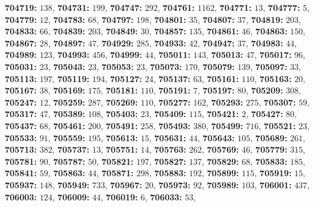 \textsf{\bfseries 704719:} $138$, \textsf{\bfseries 704731:} $199$, \textsf{\bfseries 704747:} $292$, \textsf{\bfseries 704761:} $1162$, \textsf{\bfseries 704771:} $13$, \textsf{\bfseries 704777:} $5$, \textsf{\bfseries 704779:} $12$, \textsf{\bfseries 704783:} $68$, \textsf{\bfseries 704797:} $198$, \textsf{\bfseries 704801:} $35$, \textsf{\bfseries 704807:} $37$, \textsf{\bfseries 704819:} $203$, \textsf{\bfseries 704833:} $66$, \textsf{\bfseries 704839:} $203$, \textsf{\bfseries 704849:} $30$, \textsf{\bfseries 704857:} $135$, \textsf{\bfseries 704861:} $46$, \textsf{\bfseries 704863:} $150$, \textsf{\bfseries 704867:} $28$, \textsf{\bfseries 704897:} $47$, \textsf{\bfseries 704929:} $285$, \textsf{\bfseries 704933:} $42$, \textsf{\bfseries 704947:} $37$, \textsf{\bfseries 704983:} $44$, \textsf{\bfseries 704989:} $123$, \textsf{\bfseries 704993:} $456$, \textsf{\bfseries 704999:} $44$, \textsf{\bfseries 705011:} $143$, \textsf{\bfseries 705013:} $47$, \textsf{\bfseries 705017:} $96$, \textsf{\bfseries 705031:} $23$, \textsf{\bfseries 705043:} $23$, \textsf{\bfseries 705053:} $23$, \textsf{\bfseries 705073:} $170$, \textsf{\bfseries 705079:} $139$, \textsf{\bfseries 705097:} $33$, \textsf{\bfseries 705113:} $197$, \textsf{\bfseries 705119:} $194$, \textsf{\bfseries 705127:} $24$, \textsf{\bfseries 705137:} $63$, \textsf{\bfseries 705161:} $110$, \textsf{\bfseries 705163:} $20$, \textsf{\bfseries 705167:} $38$, \textsf{\bfseries 705169:} $175$, \textsf{\bfseries 705181:} $110$, \textsf{\bfseries 705191:} $7$, \textsf{\bfseries 705197:} $80$, \textsf{\bfseries 705209:} $308$, \textsf{\bfseries 705247:} $12$, \textsf{\bfseries 705259:} $287$, \textsf{\bfseries 705269:} $110$, \textsf{\bfseries 705277:} $162$, \textsf{\bfseries 705293:} $275$, \textsf{\bfseries 705307:} $59$, \textsf{\bfseries 705317:} $47$, \textsf{\bfseries 705389:} $108$, \textsf{\bfseries 705403:} $23$, \textsf{\bfseries 705409:} $115$, \textsf{\bfseries 705421:} $2$, \textsf{\bfseries 705427:} $80$, \textsf{\bfseries 705437:} $68$, \textsf{\bfseries 705461:} $200$, \textsf{\bfseries 705491:} $258$, \textsf{\bfseries 705493:} $380$, \textsf{\bfseries 705499:} $716$, \textsf{\bfseries 705521:} $23$, \textsf{\bfseries 705533:} $91$, \textsf{\bfseries 705559:} $195$, \textsf{\bfseries 705613:} $15$, \textsf{\bfseries 705631:} $44$, \textsf{\bfseries 705643:} $105$, \textsf{\bfseries 705689:} $261$, \textsf{\bfseries 705713:} $382$, \textsf{\bfseries 705737:} $13$, \textsf{\bfseries 705751:} $14$, \textsf{\bfseries 705763:} $262$, \textsf{\bfseries 705769:} $46$, \textsf{\bfseries 705779:} $315$, \textsf{\bfseries 705781:} $90$, \textsf{\bfseries 705787:} $50$, \textsf{\bfseries 705821:} $197$, \textsf{\bfseries 705827:} $137$, \textsf{\bfseries 705829:} $68$, \textsf{\bfseries 705833:} $185$, \textsf{\bfseries 705841:} $59$, \textsf{\bfseries 705863:} $44$, \textsf{\bfseries 705871:} $298$, \textsf{\bfseries 705883:} $192$, \textsf{\bfseries 705899:} $115$, \textsf{\bfseries 705919:} $15$, \textsf{\bfseries 705937:} $148$, \textsf{\bfseries 705949:} $733$, \textsf{\bfseries 705967:} $20$, \textsf{\bfseries 705973:} $92$, \textsf{\bfseries 705989:} $103$, \textsf{\bfseries 706001:} $437$, \textsf{\bfseries 706003:} $124$, \textsf{\bfseries 706009:} $44$, \textsf{\bfseries 706019:} $6$, \textsf{\bfseries 706033:} $53$, 
